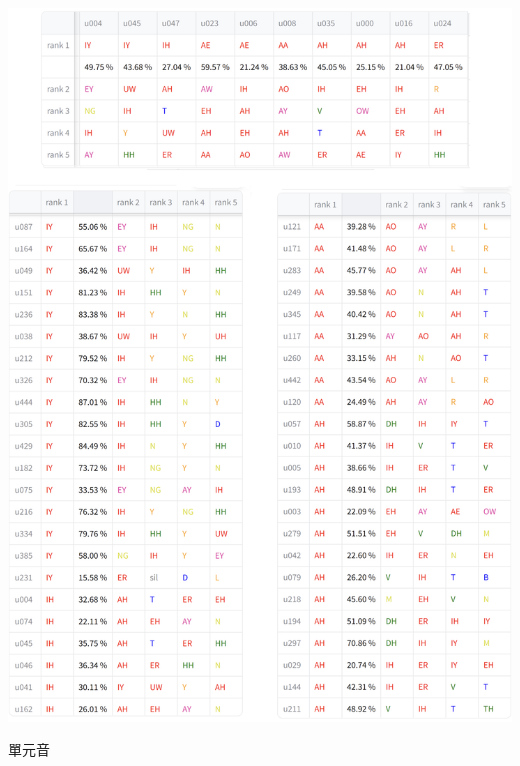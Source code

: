 {\begin{table}
            \centering
            \begin{subtable}{\textwidth}
                \centering
                \includegraphics[width=0.8\linewidth]{figures/ch4figs/vow_phn.png}
                \caption{單元音}
                \label{fig:hub-u050-ap0500-vowobs}
            \end{subtable}

            \label{fig:hub-u050-phnobserver--3}
        \end{table}
    }

